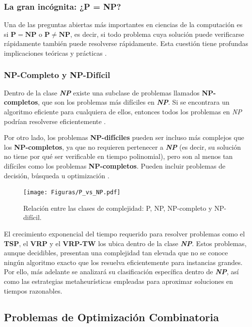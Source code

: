 \documentclass[12pt,titlepage,twoside,openright]{book}
\begin{document}
\subsubsection*{La gran incógnita: ¿P = NP?}
Una de las preguntas abiertas más importantes en ciencias de la computación es si \(\mathbf{P = NP}\) o \(\mathbf{P \neq NP}\), es decir, si todo problema cuya solución puede verificarse rápidamente también puede resolverse rápidamente. Esta cuestión tiene profundas implicaciones teóricas y prácticas \citep{maldonado2013problema}.

\subsubsection{NP-Completo y NP-Difícil}

Dentro de la clase \emph{\textbf{NP}} existe una subclase de problemas llamados \textbf{NP-completos}, que son los problemas más difíciles en \emph{\textbf{NP}}. Si se encontrara un algoritmo eficiente para cualquiera de ellos, entonces todos los problemas en \emph{NP} podrían resolverse eficientemente \citep{maldonado2013problema}.

Por otro lado, los problemas \textbf{NP-difíciles} pueden ser incluso más complejos que los \textbf{NP-completos}, ya que no requieren pertenecer a \emph{\textbf{NP}} (es decir, su solución no tiene por qué ser verificable en tiempo polinomial), pero son al menos tan difíciles como los problemas \textbf{NP-completos}. Pueden incluir problemas de decisión, búsqueda u optimización \citep{maldonado2013problema}.

\begin{figure}[H]
	\centering
	\texttt{[image: Figuras/P\_vs\_NP.pdf]}
	\caption{Relación entre las clases de complejidad: P, NP, NP-completo y NP-difícil.}
	\label{fig:p_vs_np}
\end{figure}

El crecimiento exponencial del tiempo requerido para resolver problemas como el \textbf{TSP}, el \textbf{VRP} y el \textbf{VRP-TW} los ubica dentro de la clase \emph{\textbf{NP}}. Estos problemas, aunque decidibles, presentan una complejidad tan elevada que no se conoce ningún algoritmo exacto que los resuelva eficientemente para instancias grandes. Por ello, más adelante se analizará su clasificación específica dentro de \emph{\textbf{NP}}, así como las estrategias metaheurísticas empleadas para aproximar soluciones en tiempos razonables.

\subsection{Problemas de Optimización Combinatoria}
\end{document}
